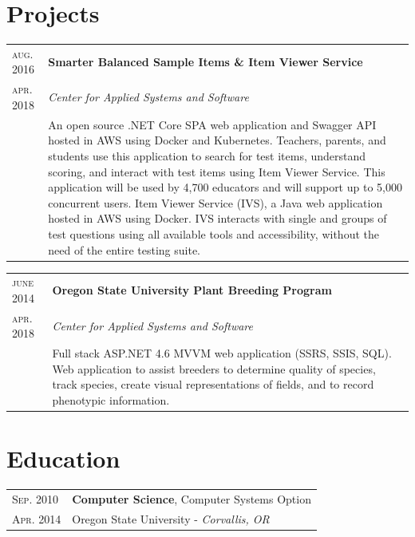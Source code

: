 \documentclass[10pt]{article}
\newenvironment{sectiontable}{ \begin{tabular}{p{16mm}|p{16cm}} }{ \end{tabular} }
\begin{document}
\section{Projects}

\begin{sectiontable}
{\small\textsc{aug. 2016}} 	& \textbf{Smarter Balanced Sample Items \& Item Viewer Service}\\
{\small\textsc{apr. 2018}}  & \emph{Center for Applied Systems and Software}\\
					& \rule{0pt}{2.3ex}\noindent    
An open source .NET Core SPA web application and Swagger API hosted in AWS using Docker and Kubernetes. \newline
Teachers, parents, and students use this application to search for test items, understand scoring, and interact with test items using Item Viewer Service. This application will be used by 4,700 educators and will support up to 5,000 concurrent users. \newline
Item Viewer Service (IVS), a Java web application hosted in AWS using Docker. IVS interacts with single and groups of test questions using all available tools and accessibility, without the need of the entire testing suite.

\end{sectiontable} 


\begin{sectiontable}
{\small\textsc{june 2014}} 	& \textbf{Oregon State University Plant Breeding Program}\\
{\small\textsc{apr. 2018}}  & \emph{Center for Applied Systems and Software}\\
					& \rule{0pt}{2.3ex}\noindent    
Full stack ASP.NET 4.6 MVVM web application (SSRS, SSIS, SQL). \newline
Web application to assist breeders to determine quality of species, track species, create visual representations of fields, and to record phenotypic information. 
\end{sectiontable} 


\section{Education}

\begin{sectiontable}

{\small\textsc{Sep. 2010}} & \textbf{Computer Science}, Computer Systems Option\\ 
{\small\textsc{Apr. 2014}}	& Oregon State University - \emph{\small Corvallis, OR}\\

\end{sectiontable}
\end{document}
